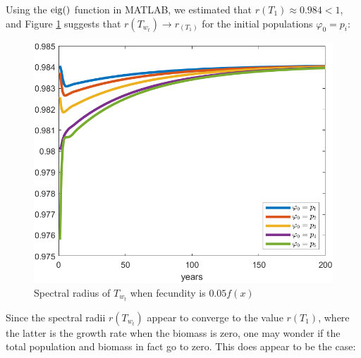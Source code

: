 Using the $\operatorname{eig}()$ function in MATLAB, we estimated that $r(T_1) \approx 0.984 < 1$, and Figure \ref{fig:spectralradiuswhenf=0.05} suggests that $r(T_{w_t}) \to r_(T_1)$ for the initial populations $\varphi_0 = p_i$:

\begin{figure}[H]
	\centering
	\includegraphics[width=0.7\linewidth]{Images/F=0.05/spectral_radius_when_f=0.05}
	\caption{Spectral radius of $T_{w_t}$ when fecundity is $0.05f(x)$}
	\label{fig:spectralradiuswhenf=0.05}
\end{figure}

Since the spectral radii $r(T_{w_t})$ appear to converge to the value $r(T_1)$, where the latter is the growth rate when the biomass is zero, one may wonder if the total population and biomass in fact go to zero. This does appear to be the case:

